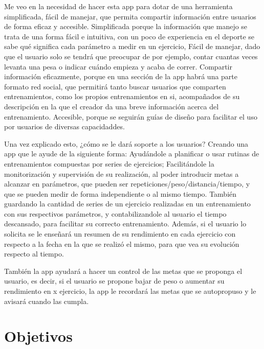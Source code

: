 Me veo en la necesidad de hacer esta app para dotar de una herramienta simplificada, fácil de manejar, que permita compartir información entre usuarios de forma eficaz y accesible. Simplificada porque la información que manejo se trata de una forma fácil e intuitiva, con un poco de experiencia en el deporte se sabe qué significa cada parámetro a medir en un ejercicio,  %
Fácil de manejar, dado que el usuario solo se tendrá que preocupar de por ejemplo, contar cuantas veces levanta una pesa o indicar cuándo empieza y acaba de correr. Compartir información eficazmente, porque en una sección de la app habrá una parte formato red social, que permitirá tanto buscar usuarios que comparten entrenamientos, como los propios entrenamientos en si, acompañados de su descripción en la que el creador da una breve información acerca del entrenamiento. Accesible, porque se seguirán guías de diseño para facilitar el uso por usuarios de diversas capacidaddes.

Una vez explicado esto, ¿cómo se le dará soporte a los usuarios? Creando una app que le ayude de la siguiente forma: Ayudándole a planificar o usar rutinas de entrenamientos compuestas por series de ejercicios; Facilitándole la monitorización y supervisión de su realización, al poder introducir metas a alcanzar en parámetros, que pueden ser repeticiones/peso/distancia/tiempo, y que se pueden medir de forma independiente o al mismo tiempo. También guardando la cantidad de series de un ejercicio realizadas en un entrenamiento con sus respectivos parámetros, y contabilizandole al usuario el tiempo descansado, para facilitar su correcto entrenamiento. Además, si el usuario lo solicita se le enseñará un resumen de su rendimiento en cada ejercicio con respecto a la fecha en la que se realizó el mismo, para que vea su evolución respecto al tiempo. 

También la app ayudará a hacer un control de las metas que se proponga el usuario, es decir, si el usuario se propone bajar de peso o aumentar su rendimiento en x ejercicio, la app le recordará las metas que se autopropuso y le avisará cuando las cumpla. 

\section{Objetivos}


